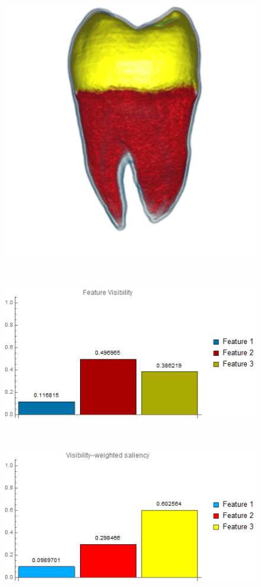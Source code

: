 \begin{figure}
	\centering
	\begin{minipage}{.24\textwidth}
		\includegraphics[width=1\linewidth]{images/tooth_naive_optimized_linesearch}
		\subcaption{}
	\end{minipage}~
	\begin{minipage}{.24\textwidth}
		\includegraphics[width=1\linewidth]{images/tooth_naive_optimized_linesearch_visibility_chart}
		\subcaption{}
	\end{minipage}~
	\begin{minipage}{.24\textwidth}
		\includegraphics[width=1\linewidth]{images/tooth_naive_optimized_linesearch_visibility_saliency_weighted_chart}

\end{minipage}
\end{figure}
